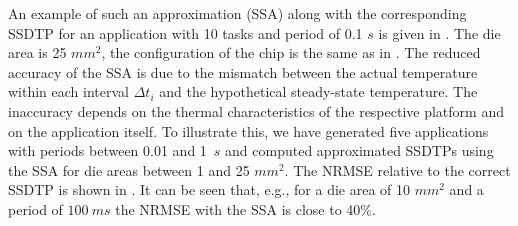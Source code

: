 An example of such an approximation (SSA) along with the corresponding SSDTP for an application with 10 tasks and period of 0.1 $s$ is given in . The die area is 25 $mm^2$, the configuration of the chip is the same as in . The reduced accuracy of the SSA is due to the mismatch between the actual temperature within each interval $\Delta t_i$ and the hypothetical steady-state temperature. The inaccuracy depends on the thermal characteristics of the respective platform and on the application itself. To illustrate this, we have generated five applications with periods between 0.01 and 1~$s$ and computed approximated SSDTPs using the SSA for die areas between 1 and 25 $mm^2$. The NRMSE relative to the correct SSDTP is shown in . It can be seen that, e.g., for a die area of 10 $mm^2$ and a period of $100~ms$ the NRMSE with the SSA is close to 40\%.
